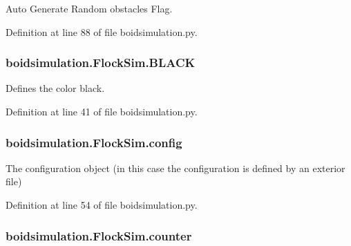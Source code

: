 Auto Generate Random obstacles Flag. 



Definition at line 88 of file boidsimulation.\-py.

\hypertarget{classboidsimulation_1_1FlockSim_ac9c61aa93f3db94b9a340b8555d90adf}{
\subsubsection[{B\-L\-A\-C\-K}]{\setlength{\rightskip}{0pt plus 5cm}boidsimulation.\-Flock\-Sim.\-B\-L\-A\-C\-K}}\label{classboidsimulation_1_1FlockSim_ac9c61aa93f3db94b9a340b8555d90adf}


Defines the color black. 



Definition at line 41 of file boidsimulation.\-py.

\hypertarget{classboidsimulation_1_1FlockSim_abf487d6e84851334a79656b5df3c8492}{
\subsubsection[{config}]{\setlength{\rightskip}{0pt plus 5cm}boidsimulation.\-Flock\-Sim.\-config}}\label{classboidsimulation_1_1FlockSim_abf487d6e84851334a79656b5df3c8492}


The configuration object (in this case the configuration is defined by an exterior file) 



Definition at line 54 of file boidsimulation.\-py.

\hypertarget{classboidsimulation_1_1FlockSim_af378fd310919691dec50f5d312931726}{
\subsubsection[{counter}]{\setlength{\rightskip}{0pt plus 5cm}boidsimulation.\-Flock\-Sim.\-counter}}\label{classboidsimulation_1_1FlockSim_af378fd310919691dec50f5d312931726}


